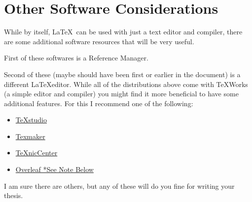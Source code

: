 	\section{Other Software Considerations}
		While by itself, \LaTeX\ can be used with just a text editor and compiler, there are some additional software resources that will be very useful.
		
		First of these softwares is a Reference Manager.
		
		
		Second of these (maybe should have been first or earlier in the document) is a different \LaTeX editor.
		While all of the distributions above come with TeXWorks (a simple editor and compiler) you might find it more beneficial to have some additional features.
		For this I recommend one of the following:
		\begin{itemize}
			\item \href{https://www.texstudio.org/}{TeXstudio}
			\item \href{http://www.xm1math.net/texmaker/}{Texmaker}
			\item \href{http://www.texniccenter.org/}{TeXnicCenter}
			\item \href{https://www.overleaf.com/}{Overleaf *See Note Below}
		\end{itemize}
				I am sure there are others, but any of these will do you fine for writing your thesis.
		
